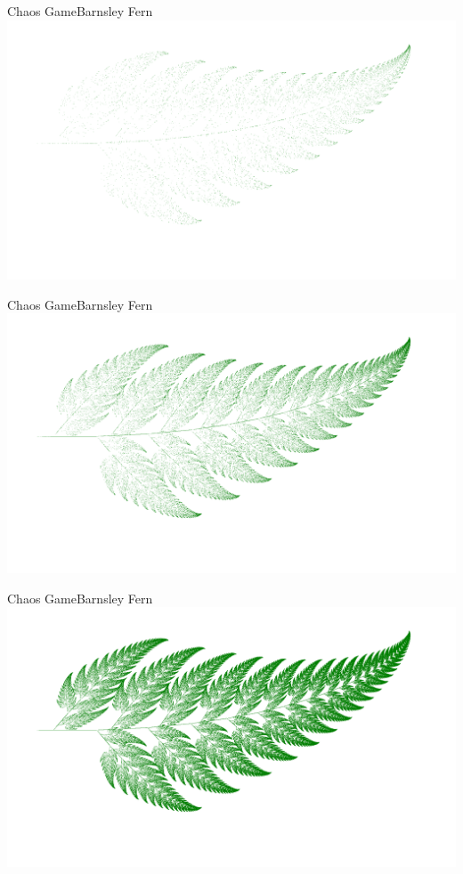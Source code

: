 \documentclass[usenames,dvipsnames,svgnames,10pt,aspectratio=169]{beamer}
\begin{document}
\begin{frame}[t, c]{Chaos Game}{Barnsley Fern}
	\centering
	\includegraphics[width=.8\textwidth]{Barnsley_fern_3}
	\vspace{1cm}
\end{frame}

\begin{frame}[t, c]{Chaos Game}{Barnsley Fern}
	\centering
	\includegraphics[width=.8\textwidth]{Barnsley_fern_4}
	\vspace{1cm}
\end{frame}

\begin{frame}[t, c]{Chaos Game}{Barnsley Fern}
	\centering
	\includegraphics[width=.8\textwidth]{Barnsley_fern_5}
	\vspace{1cm}
\end{frame}
\end{document}
